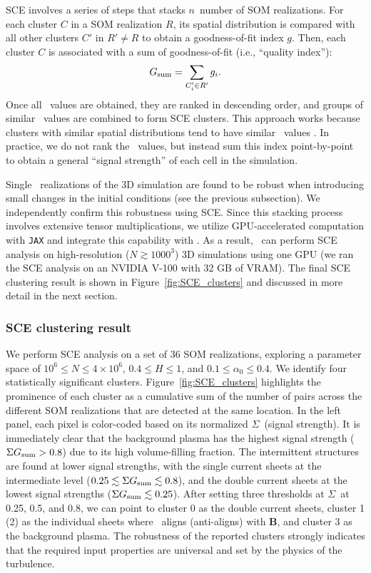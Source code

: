 SCE involves a series of steps that stacks $n$~number of SOM realizations. For each cluster $C$ in a SOM realization $R$, its spatial distribution is compared with all other clusters $C'$ in $R' \neq R$ to obtain a goodness-of-fit index $g$. Then, each cluster $C$ is associated with a sum of goodness-of-fit (i.e., ``quality index''):
\begin{equation}
    G_{\rm sum} = \sum_{C_i' \in R'} g_i.
\end{equation}
Once all \gsum\ values are obtained, they are ranked in descending order, and groups of similar \gsum\ values are combined to form SCE clusters.
This approach works because clusters with similar spatial distributions tend to have similar \gsum\ values \citep[see Figure 6 of][]{bussov_maarja_segmentation_2021}. In practice, we do not rank the \gsum\ values, but instead sum this index point-by-point to obtain a general ``signal strength'' of each cell in the simulation.

Single \awesom\ realizations of the 3D simulation are found to be robust when introducing small changes in the initial conditions (see the previous subsection).
We independently confirm this robustness using SCE\@.
Since this stacking process involves extensive tensor multiplications, we utilize GPU-accelerated computation with \texttt{JAX} \citep{bradbury_jax_2018} and integrate this capability with \awesom\@.
As a result, \awesom\ can perform SCE analysis on high-resolution ($N \gtrsim 1000^3$) 3D simulations using one GPU (we ran the SCE analysis on an NVIDIA V-100 with 32 GB of VRAM)\@.
The final SCE clustering result is shown in Figure~\ref{fig:SCE_clusters} and discussed in more detail in the next section.

\subsubsection{SCE clustering result} \label{app:sce-result}
We perform SCE analysis on a set of 36 SOM realizations, exploring a parameter space of $10^6 \leq N \leq 4 \times 10^6$, $0.4 \leq H \leq 1$, and $0.1 \leq \alpha_0 \leq 0.4$.
We identify four statistically significant clusters. Figure~\ref{fig:SCE_clusters} highlights the prominence of each cluster as a cumulative sum of the number of pairs across the different SOM realizations that are detected at the same location.
In the left panel, each pixel is color-coded based on its normalized $\Sigma$\gsum\ (signal strength).
It is immediately clear that the background plasma has the highest signal strength ($\Sigma G_{\rm sum} > 0.8$) due to its high volume-filling fraction.
The intermittent structures are found at lower signal strengths, with the single current sheets at the intermediate level ($0.25 \lesssim \Sigma G_{\rm sum} \lesssim 0.8$), and the double current sheets at the lowest signal strengths ($\Sigma G_{\rm sum} \lesssim 0.25$).
After setting three thresholds at $\Sigma$\gsum\ at 0.25, 0.5, and 0.8, we can point to cluster 0 as the double current sheets, cluster 1 (2) as the individual sheets where \jpar\ aligns (anti-aligns) with $\mathbf{B}$, and cluster 3 as the background plasma.
The robustness of the reported clusters strongly indicates that the required input properties are universal and set by the physics of the turbulence.

